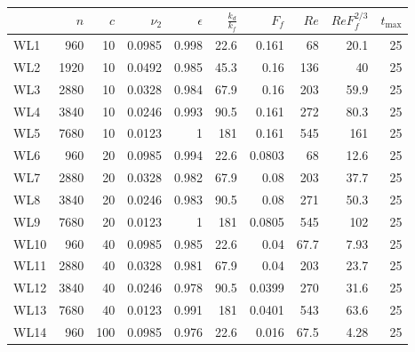 \begin{table}
\begin{center}

\label{Table2}

\begin{tabular}{lrrrrrrrrr}
\toprule
{} &  $n$ &  $c$ &  $\nu_2$ &  $\epsilon$   &   $\frac{k_{d}}{k_f}$   &   $F_f$ &  $Re$ &  $ReF_f^{2/3}$ &  $t_{\max}$ \\
\midrule
WL1  &  960 &   10 &   0.0985 &       0.998 &                    22.6 &   0.161 &    68 &           20.1 &          25 \\
WL2  & 1920 &   10 &   0.0492 &       0.985 &                    45.3 &    0.16 &   136 &             40 &          25 \\
WL3  & 2880 &   10 &   0.0328 &       0.984 &                    67.9 &    0.16 &   203 &           59.9 &          25 \\
WL4  & 3840 &   10 &   0.0246 &       0.993 &                    90.5 &   0.161 &   272 &           80.3 &          25 \\
WL5  & 7680 &   10 &   0.0123 &           1 &                     181 &   0.161 &   545 &            161 &          25 \\
WL6  &  960 &   20 &   0.0985 &       0.994 &                    22.6 &  0.0803 &    68 &           12.6 &          25 \\
WL7  & 2880 &   20 &   0.0328 &       0.982 &                    67.9 &    0.08 &   203 &           37.7 &          25 \\
WL8  & 3840 &   20 &   0.0246 &       0.983 &                    90.5 &    0.08 &   271 &           50.3 &          25 \\
WL9  & 7680 &   20 &   0.0123 &           1 &                     181 &  0.0805 &   545 &            102 &          25 \\
WL10 &  960 &   40 &   0.0985 &       0.985 &                    22.6 &    0.04 &  67.7 &           7.93 &          25 \\
WL11 & 2880 &   40 &   0.0328 &       0.981 &                    67.9 &    0.04 &   203 &           23.7 &          25 \\
WL12 & 3840 &   40 &   0.0246 &       0.978 &                    90.5 &  0.0399 &   270 &           31.6 &          25 \\
WL13 & 7680 &   40 &   0.0123 &       0.991 &                     181 &  0.0401 &   543 &           63.6 &          25 \\
WL14 &  960 &  100 &   0.0985 &       0.976 &                    22.6 &   0.016 &  67.5 &           4.28 &          25 \\

\end{tabular}
\end{center}
\end{table}
